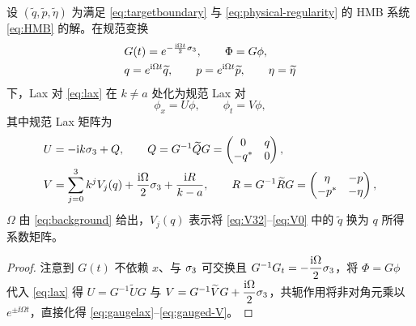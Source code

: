 \begin{proposition}\label{prop:gauge}
设 $(\widetilde q,\widetilde p,\widetilde\eta)$ 为满足 \eqref{eq:targetboundary} 与 \eqref{eq:physical-regularity} 的 HMB 系统 \eqref{eq:HMB} 的解。在规范变换
\begin{equation}\label{eq:gauge}
\begin{aligned}
&G(t)=e^{-\frac{\mathrm{i}\Omega t}{2}\sigma_3},\qquad \Phi=G\phi,\\
&q=e^{\mathrm{i}\Omega t}\widetilde q,\qquad
p=e^{\mathrm{i}\Omega t}\widetilde p,\qquad
\eta=\widetilde\eta
\end{aligned}
\end{equation}
下，Lax 对 \eqref{eq:lax} 在 $k\ne a$ 处化为规范 Lax 对
\begin{equation}\label{eq:gaugelax}
\phi_x=U\phi,\qquad \phi_t=V\phi,
\end{equation}
其中规范 Lax 矩阵为
\begin{align}
&U=-\mathrm{i} k\sigma_3+Q,\qquad
Q=G^{-1}\widetilde QG=\begin{pmatrix}0&q\\-{q}^{*}&0\end{pmatrix},\label{eq:gauged-U}\\
&V=\sum\limits_{j=0}^{3}k^jV_j(q)+\dfrac{\mathrm{i}\Omega}{2}\sigma_3+\dfrac{\mathrm{i} R}{k-a},\qquad
R=G^{-1}\widetilde RG=\begin{pmatrix}\eta&-p\\-{p}^{*}&-\eta\end{pmatrix},\label{eq:gauged-V}
\end{align}
$\Omega$ 由 \eqref{eq:background} 给出，$V_j(q)$ 表示将 \eqref{eq:V32}--\eqref{eq:V0} 中的 $\widetilde q$ 换为 $q$ 所得系数矩阵。
\end{proposition}
\begin{proof}
注意到 $G(t)$ 不依赖 $x$、与 $\sigma_3$ 可交换且 $G^{-1}G_t=-\dfrac{\mathrm{i}\Omega}{2}\sigma_3$，将 $\Phi=G\phi$ 代入 \eqref{eq:lax} 得 $U=G^{-1}\widetilde UG$ 与 $V=G^{-1}\widetilde VG+\dfrac{\mathrm{i}\Omega}{2}\sigma_3$，共轭作用将非对角元乘以 $e^{\pm\ii\Omega t}$，直接化得 \eqref{eq:gaugelax}--\eqref{eq:gauged-V}。
\end{proof}

